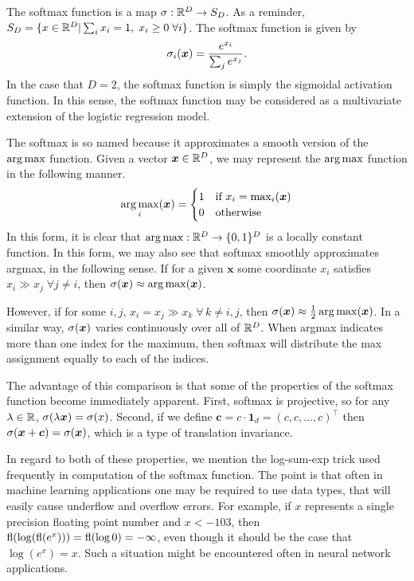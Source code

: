 \label{softmax}

The softmax function is a map \(\sigma:\mathbb R^D \rightarrow S_D\). As a reminder,
 \(S_D = \{x\in\mathbb R^D|\sum_i x_i = 1, \; x_i\geq 0 \; \forall i\}\). The softmax function is given by
 \begin{equation}\label{eqn:softmaxDef}
 \sigma_i(\bm x) = \frac{e^{x_i}}{\sum_j e^{x_j}}.
 \end{equation}
 In the case that \(D=2\), the softmax function is simply the sigmoidal 
 activation function. In this sense, the softmax function may be considered as
 a multivariate extension of the logistic regression model.

 The softmax is so named because it approximates a smooth version of the 
 \(\operatorname*{arg\,max}\) function.   Given a vector \(\bm x\in \mathbb R^{D}\), we may 
 represent the \(\operatorname*{arg\,max}\) function in the following manner.
 \begin{equation*}
	 \operatorname*{arg\,max}_i(\bm x) = 
	 \begin{cases}
	 	1 & \text{if } x_i = \max_i(\bm x)\\
	 	0 & \text{otherwise}
	 \end{cases}
 \end{equation*}
 In this form, it is clear that \(\operatorname*{arg\,max}:\mathbb R^D\rightarrow \{0,1\}^{D}\) is 
 a locally constant function.  In this form, we may also see that softmax 
 smoothly approximates argmax, in the following sense.  If for a given 
 \(\bm x\) some coordinate \(x_i\) satisfies \(x_i\gg x_j\;\forall j\neq i\), 
 then \(\sigma(\bm x) \approx \operatorname*{arg\,max}(\bm x)\).

 However, if for some \(i,j\), \(x_i=x_j\gg x_k\;\forall\, k\neq i,j\), then 
 \(\sigma(\bm x) \approx \frac 12 \operatorname*{arg\,max}(\bm x)\).  In a similar way, 
 \(\sigma(\bm x)\) varies continuously over all of \(\mathbb R^D\). When argmax 
 indicates more than one index for the maximum, then softmax will distribute 
 the max assignment equally to each of the indices.

 The advantage of this comparison is that some of the properties of the 
 softmax function become immediately apparent.  First, softmax is projective, 
 so for any \(\lambda \in\mathbb R\), \(\sigma(\lambda\bm x) = \sigma(x)\). Second, if we define 
 \(\bm c = c\cdot \bm 1_d = (c,c,\ldots,c)^{\intercal}\) then 
 \(\sigma(\bm x+\bm c)=\sigma(\bm x)\), which is a type of translation invariance.

 In regard to both of these properties, we mention the log-sum-exp trick used 
 frequently in computation of the softmax function. The point is that often in 
 machine learning applications one may be required to use data types, that 
 will easily cause underflow and overflow errors.  For example, if \(x\) 
 represents a single precision floating point number and \(x<-103\), then 
 \(\operatorname{fl}(\log(\operatorname{fl}(e^x))) = \operatorname{fl}(\log 0) = -\infty\), even though it 
 should be the case that \(\log(e^x) = x\). Such a situation might be 
 encountered often in neural network applications.

